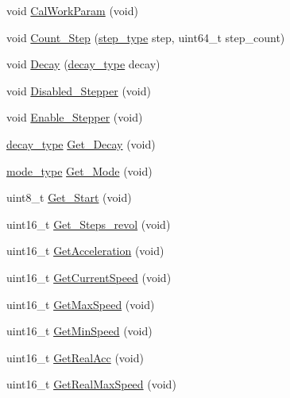 \begin{DoxyCompactItemize}
\item 
void \hyperlink{group__biba__drv_ga3389079a7106f1e741c0bc447dfbcbca}{Cal\-Work\-Param} (void)
\item 
void \hyperlink{group__biba__drv_ga961e1c89176d3c56101bb4eddf6642dc}{Count\-\_\-\-Step} (\hyperlink{group__biba__drv_ga3af682b92aa259509aea217f6dc64356}{step\-\_\-type} step, uint64\-\_\-t step\-\_\-count)
\item 
void \hyperlink{group__biba__drv_gade0e100f335652e364c58ae4a5c89ba4}{Decay} (\hyperlink{group__biba__drv_gafe05744bd777532cf059c0d7293a7ab8}{decay\-\_\-type} decay)
\item 
void \hyperlink{group__biba__drv_ga5b763d9479149e1cd8843fa5f144a18a}{Disabled\-\_\-\-Stepper} (void)
\item 
void \hyperlink{group__biba__drv_gab1ea57d26402b13aaed719a4d11097d5}{Enable\-\_\-\-Stepper} (void)
\item 
\hyperlink{group__biba__drv_gafe05744bd777532cf059c0d7293a7ab8}{decay\-\_\-type} \hyperlink{group__biba__drv_ga20503ca831d18cf625abe0f6e98d281a}{Get\-\_\-\-Decay} (void)
\item 
\hyperlink{group__biba__drv_ga19269c193c0c4866cdc4e5abd433f9fc}{mode\-\_\-type} \hyperlink{group__biba__drv_ga51c375fddbfeaed5366cd0bf2f9a2dab}{Get\-\_\-\-Mode} (void)
\item 
uint8\-\_\-t \hyperlink{group__biba__drv_gabdfa1389f4c68fca40077275f7727fea}{Get\-\_\-\-Start} (void)
\item 
uint16\-\_\-t \hyperlink{group__biba__drv_ga5591760e7dd32c026ec449f0d516af28}{Get\-\_\-\-Steps\-\_\-revol} (void)
\item 
uint16\-\_\-t \hyperlink{group__biba__drv_ga6202c4fd41a45376809e5940428467b9}{Get\-Acceleration} (void)
\item 
uint16\-\_\-t \hyperlink{group__biba__drv_ga56c30e2b82a23aed1c9febd704166090}{Get\-Current\-Speed} (void)
\item 
uint16\-\_\-t \hyperlink{group__biba__drv_ga356f958c8327643ae22d240493ae7747}{Get\-Max\-Speed} (void)
\item 
uint16\-\_\-t \hyperlink{group__biba__drv_gab0cfe10ce4af9fb931391f171566fef2}{Get\-Min\-Speed} (void)
\item 
uint16\-\_\-t \hyperlink{group__biba__drv_ga819f85ff37467b16c6e6e31ffc858619}{Get\-Real\-Acc} (void)
\item 
uint16\-\_\-t \hyperlink{group__biba__drv_ga20bfcaca6af265d5f8b2dc50f3a26779}{Get\-Real\-Max\-Speed} (void)

\end{DoxyCompactItemize}
